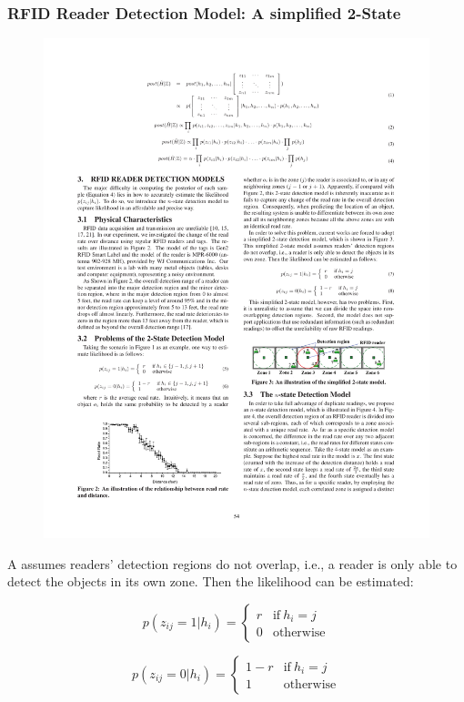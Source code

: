 \begin{frame}
\frametitle{RFID Reader Detection Model: A simplified 2-State}

\begin{figure}[tb]
  \includegraphics[width=0.8\columnwidth]{figures/3-1/3-1-4.pdf}
\end{figure}

A  assumes readers' detection regions do not overlap, i.e., a reader is only able to detect the objects in its own zone. Then the likelihood can be estimated:

\begin{equation}
  p(z_{ij} = 1 | h_i) = \left\{\begin{matrix}
 r & \text{if}~h_i = j\\
 0 & \text{otherwise}
\end{matrix}\right.
\end{equation}

\begin{equation}
  p(z_{ij} = 0 | h_i) = \left\{\begin{matrix}
 1-r & \text{if}~h_i = j\\
 1 & \text{otherwise}
\end{matrix}\right.
\end{equation}

\end{frame}

